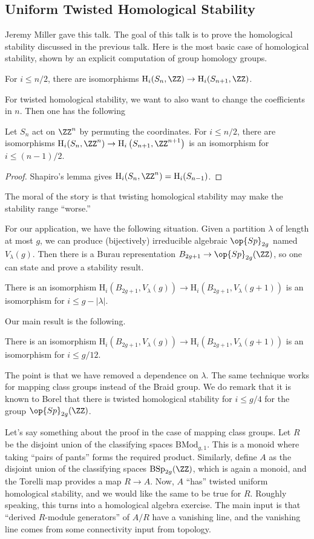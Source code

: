 \documentclass{article}
\begin{document}
\subsection{Uniform Twisted Homological Stability}
Jeremy Miller gave this talk. The goal of this talk is to prove the homological stability discussed in the previous talk. Here is the most basic case of homological stability, shown by an explicit computation of group homology groups.
\begin{theorem}[Nakoaka]
	For $i\le n/2$, there are isomorphisms $\mathrm H_i(S_n,\ZZ)\to\mathrm H_i(S_{n+1},\ZZ)$.
\end{theorem}
For twisted homological stability, we want to also want to change the coefficients in $n$. Then one has the following
\begin{theorem}
	Let $S_n$ act on $\ZZ^n$ by permuting the coordinates. For $i\le n/2$, there are isomorphisms $\mathrm H_i(S_n,\ZZ^n)\to\mathrm H_i\left(S_{n+1},\ZZ^{n+1}\right)$ is an isomorphism for $i\le(n-1)/2$.
\end{theorem}
\begin{proof}
	Shapiro's lemma gives $\mathrm H_i(S_n,\ZZ^n)=\mathrm H_i(S_{n-1})$.
\end{proof}
The moral of the story is that twisting homological stability may make the stability range ``worse.''

For our application, we have the following situation. Given a partition $\lambda$ of length at most $g$, we can produce (bijectively) irreducible algebraic $\op{Sp}_{2g}$ named $V_\lambda(g)$. Then there is a Burau representation $B_{2g+1}\to\op{Sp}_{2g}(\ZZ)$, so one can state and prove a stability result.
\begin{theorem}
	There is an isomorphism $\mathrm H_i(B_{2g+1},V_\lambda(g))\to\mathrm H_i(B_{2g+1},V_\lambda(g+1))$ is an isomorphism for $i\le g-\left|\lambda\right|$.
\end{theorem}
Our main result is the following.
\begin{theorem}
	There is an isomorphism $\mathrm H_i(B_{2g+1},V_\lambda(g))\to\mathrm H_i(B_{2g+1},V_\lambda(g+1))$ is an isomorphism for $i\le g/12$.
\end{theorem}
The point is that we have removed a dependence on $\lambda$. The same technique works for mapping class groups instead of the Braid group. We do remark that it is known to Borel that there is twisted homological stability for $i\le g/4$ for the group $\op{Sp}_{2g}(\ZZ)$.

Let's say something about the proof in the case of mapping class groups. Let $R$ be the disjoint union of the classifying spaces $\mathrm{BMod}_{g,1}$. This is a monoid where taking ``pairs of pants'' forms the required product. Similarly, define $A$ as the disjoint union of the classifying spaces $\mathrm{BSp}_{2g}(\ZZ)$, which is again a monoid, and the Torelli map provides a map $R\to A$. Now, $A$ ``has'' twisted uniform homological stability, and we would like the same to be true for $R$. Roughly speaking, this turns into a homological algebra exercise. The main input is that ``derived $R$-module generators'' of $A/R$ have a vanishing line, and the vanishing line comes from some connectivity input from topology.
\end{document}
